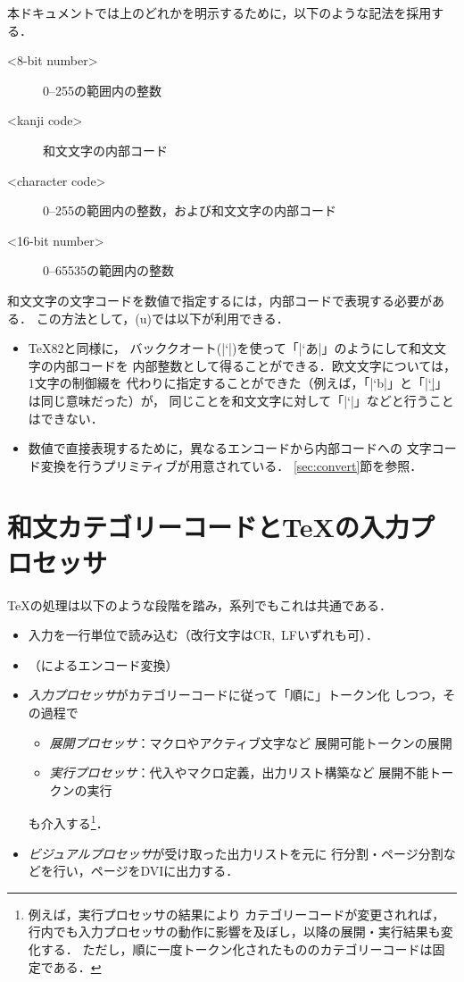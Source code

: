 \documentclass[a4paper,11pt,nomag,dvipdfmx]{jsarticle}
\begin{document}
\medskip

本ドキュメントでは上のどれかを明示するために，以下のような記法を採用する．
\begin{description}
 \item[<8-bit number>] 0--255の範囲内の整数
 \item[<kanji code>] 和文文字の内部コード
 \item[<character code>] 0--255の範囲内の整数，および和文文字の内部コード
 \item[<16-bit number>] 0--65535の範囲内の整数
\end{description}

和文文字の文字コードを数値で指定するには，内部コードで表現する必要がある．
この方法として，(u)\pTeX では以下が利用できる．
\begin{itemize}
 \item \TeX82と同様に，
  バッククオート(|`|)を使って「|`あ|」のようにして和文文字の内部コードを
  内部整数として得ることができる．欧文文字については，1文字の制御綴を
  代わりに指定することができた（例えば，「|`b|」と「|`\b|」は同じ意味だった）が，
  同じことを和文文字に対して「|`\あ|」などと行うことはできない．
 \item 数値で直接表現するために，異なるエンコードから内部コードへの
  文字コード変換を行うプリミティブが用意されている．
  \ref{sec:convert}節を参照．
\end{itemize}

\section{和文カテゴリーコードと\TeX の入力プロセッサ}

\TeX の処理は以下のような段階を踏み，\pTeX 系列でもこれは共通である．
\begin{itemize}
 \item 入力を一行単位で読み込む（改行文字はCR,~LFいずれも可）．
 \item （によるエンコード変換）
 \item \emph{入力プロセッサ}がカテゴリーコードに従って「順に」トークン化
   しつつ，その過程で
  \begin{itemize}
   \item \emph{展開プロセッサ}：マクロやアクティブ文字など
     展開可能トークンの展開
   \item \emph{実行プロセッサ}：代入やマクロ定義，出力リスト構築など
     展開不能トークンの実行
  \end{itemize}
   も介入する\footnote{例えば，実行プロセッサの結果により
   カテゴリーコードが変更されれば，
   行内でも入力プロセッサの動作に影響を及ぼし，以降の展開・実行結果も変化する．
   ただし，順に一度トークン化されたもののカテゴリーコードは固定である．}．
 \item \emph{ビジュアルプロセッサ}が受け取った出力リストを元に
   行分割・ページ分割などを行い，ページをDVIに出力する．
\end{itemize}
\end{document}
